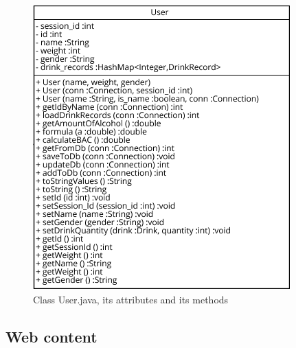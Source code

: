 \begin{figure}[H]
\centering
   \includegraphics{./figures/user.png}
   \caption{Class User.java, its attributes and its methods}
   \label{fig:userJava}
\end{figure}

\subsection{Web content}
\label{ssec:server}